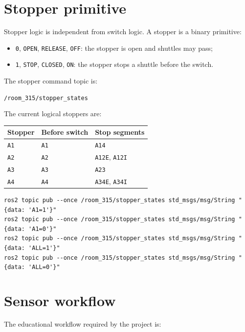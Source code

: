 \documentclass[12pt,a4paper]{report}
\newcommand{\codenext}[1]{\par\Needspace{#1\baselineskip}}
\begin{document}
\section{Stopper primitive}

Stopper logic is independent from switch logic. A stopper is a binary primitive:

\begin{itemize}
\item \texttt{0}, \texttt{OPEN}, \texttt{RELEASE}, \texttt{OFF}: the stopper is
open and shuttles may pass;
\item \texttt{1}, \texttt{STOP}, \texttt{CLOSED}, \texttt{ON}: the stopper stops
a shuttle before the switch.
\end{itemize}

The stopper command topic is:

\begin{center}
\texttt{/room\_315/stopper\_states}
\end{center}

The current logical stoppers are:

\begin{longtable}{@{}lll@{}}
\toprule
Stopper & Before switch & Stop segments \\
\midrule
\endhead
\texttt{A1} & \texttt{A1} & \texttt{A14} \\
\texttt{A2} & \texttt{A2} & \texttt{A12E}, \texttt{A12I} \\
\texttt{A3} & \texttt{A3} & \texttt{A23} \\
\texttt{A4} & \texttt{A4} & \texttt{A34E}, \texttt{A34I} \\
\bottomrule
\end{longtable}

\codenext{8}
\begin{lstlisting}[style=terminalcode,caption={Stopper commands.}]
ros2 topic pub --once /room_315/stopper_states std_msgs/msg/String "{data: 'A1=1'}"
ros2 topic pub --once /room_315/stopper_states std_msgs/msg/String "{data: 'A1=0'}"
ros2 topic pub --once /room_315/stopper_states std_msgs/msg/String "{data: 'ALL=1'}"
ros2 topic pub --once /room_315/stopper_states std_msgs/msg/String "{data: 'ALL=0'}"
\end{lstlisting}

\section{Sensor workflow}

The educational workflow required by the project is:
\end{document}
